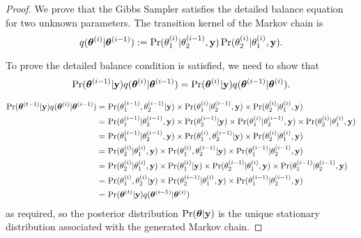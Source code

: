 \begin{proof}
    We prove that the Gibbs Sampler satisfies the detailed balance
    equation for two unknown parameters.
    The transition kernel of the Markov chain is
    $$
        q(\bm{\theta}^{(i)}|\bm{\theta}^{(i-1)})
        := \Pr(\theta^{(i)}_1 | \theta^{(i-1)}_2, \mathbf{y})
        \Pr(\theta^{(i)}_2 | \theta^{(i)}_1, \mathbf{y}).
    $$

    To prove the detailed balance condition is satisfied, we need to show that
    $$
        \Pr(\bm{\theta}^{(i-1)}| \mathbf{y})q(\bm{\theta}^{(i)}|\bm{\theta}^{(i-1)})
        = \Pr(\bm{\theta}^{(i)}| \mathbf{y})q(\bm{\theta}^{(i - 1)}|\bm{\theta}^{(i)}).
    $$

    \begin{align*}
        \Pr(\bm{\theta}^{(t-1)}| \mathbf{y})q(\bm{\theta}^{(i)}|\bm{\theta}^{(i-1)})
        = & \, \Pr(\theta_1^{(i-1)}, \theta_2^{(i-1)}| \mathbf{y}) \times
        \Pr(\theta^{(i)}_1 | \theta^{(i-1)}_2, \mathbf{y}) \times
        \Pr(\theta^{(i)}_2 | \theta^{(i)}_1, \mathbf{y})                        \\
        = & \, \Pr(\theta_1^{(i-1)}| \theta_2^{(i-1)}, \mathbf{y}) \times
        \Pr(\theta_2^{(i-1)}| \mathbf{y}) \times
        \Pr(\theta^{(i)}_1 | \theta^{(i-1)}_2, \mathbf{y}) \times
        \Pr(\theta^{(i)}_2 | \theta^{(i)}_1, \mathbf{y})                        \\
        = & \, \Pr(\theta_1^{(i-1)}| \theta_2^{(i-1)}, \mathbf{y}) \times
        \Pr(\theta^{(i)}_1, \theta^{(i-1)}_2 | \mathbf{y}) \times
        \Pr(\theta^{(i)}_2 | \theta^{(i)}_1, \mathbf{y})                        \\
        = & \, \Pr(\theta^{(i)}_2 | \theta^{(i)}_1, \mathbf{y}) \times
        \Pr(\theta^{(i)}_1, \theta^{(i-1)}_2 | \mathbf{y}) \times
        \Pr(\theta_1^{(i-1)}| \theta_2^{(i-1)}, \mathbf{y})                     \\
        = & \, \Pr(\theta^{(i)}_2 | \theta^{(i)}_1, \mathbf{y}) \times
        \Pr(\theta^{(i)}_1 | \mathbf{y})  \times
        \Pr(\theta^{(i-1)}_2 | \theta^{(i)}_1, \mathbf{y}) \times
        \Pr(\theta_1^{(i-1)}| \theta_2^{(i-1)}, \mathbf{y})                     \\
        = & \, \Pr(\theta^{(i)}_1, \theta^{(i)}_2| \mathbf{y}) \times
        \Pr(\theta^{(i-1)}_2 | \theta^{(i)}_1, \mathbf{y}) \times
        \Pr(\theta_1^{(i-1)}| \theta_2^{(i-1)}, \mathbf{y})                     \\
        = & \, \Pr(\bm{\theta}^{(t)}| \mathbf{y}) q(\bm{\theta}^{(i -1)}|\bm{\theta}^{(i)})
    \end{align*}
    as required, so the posterior distribution $\Pr(\bm{\theta}|\mathbf{y})$ is the unique
    stationary distribution associated with the generated Markov chain.
\end{proof}

